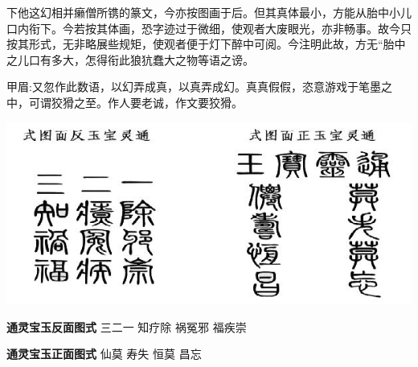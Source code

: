 \begin{parag}
下他这幻相并癞僧所镌的篆文，今亦按图画于后。但其真体最小，方能从胎中小儿口内衔下。今若按其体画，恐字迹过于微细，使观者大废眼光，亦非畅事。故今只按其形式，无非略展些规矩，使观者便于灯下醉中可阅。今注明此故，方无“胎中之儿口有多大，怎得衔此狼犺蠢大之物等语之谤。\begin{note}甲眉:又忽作此数语，以幻弄成真，以真弄成幻。真真假假，恣意游戏于笔墨之中，可谓狡猾之至。作人要老诚，作文要狡猾。\end{note}
\end{parag}

\includegraphics{1-80/8-1}

\begin{qute}

    \begin{parag}\textbf{通灵宝玉反面图式} \newline
        \indent 三二一\newline
        \indent 知疗除\newline
        \indent 祸冤邪\newline
        \indent 福疾崇\newline
    \end{parag}


    \begin{parag}
        \textbf{通灵宝玉正面图式}\newline
        \indent 仙莫\newline
        \indent 寿失\newline
        \indent 恒莫\newline
        \indent 昌忘\newline
    \end{parag}
\end{qute}


